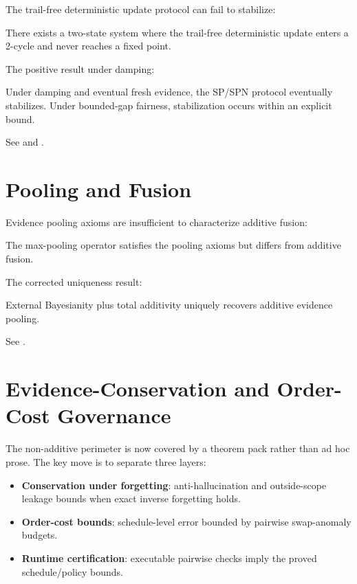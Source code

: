 \documentclass[11pt,openany]{report}
\begin{document}
The trail-free deterministic update protocol can fail to stabilize:

\begin{theorem}
There exists a two-state system where the trail-free deterministic update
enters a 2-cycle and never reaches a fixed point.
\end{theorem}

The positive result under damping:

\begin{theorem}
Under damping and eventual fresh evidence, the SP/SPN protocol eventually
stabilizes.  Under bounded-gap fairness, stabilization occurs within an
explicit bound.
\end{theorem}

See 
and .

\section{Pooling and Fusion}

Evidence pooling axioms are insufficient to characterize additive fusion:

\begin{theorem}
The max-pooling operator satisfies the pooling axioms but differs from
additive fusion.
\end{theorem}

The corrected uniqueness result:

\begin{theorem}
External Bayesianity plus total additivity uniquely recovers additive
evidence pooling.
\end{theorem}

See .

\section{Evidence-Conservation and Order-Cost Governance}

The non-additive perimeter is now covered by a theorem pack rather than
ad hoc prose.  The key move is to separate three layers:
\begin{itemize}
\item \textbf{Conservation under forgetting}: anti-hallucination and
  outside-scope leakage bounds when exact inverse forgetting holds.
\item \textbf{Order-cost bounds}: schedule-level error bounded by
  pairwise swap-anomaly budgets.
\item \textbf{Runtime certification}: executable pairwise checks imply the
  proved schedule/policy bounds.
\end{itemize}
\end{document}
